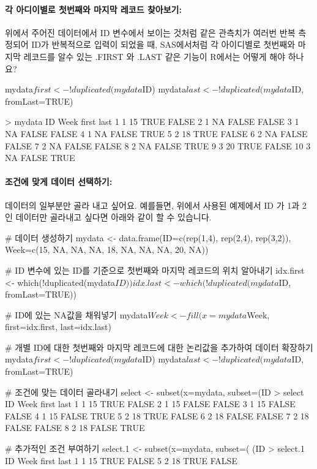 \documentclass{report}
\begin{document}
\paragraph{각 아디이별로 첫번째와 마지막 레코드 찾아보기: } 위에서 주어진 데이터에서 ID 변수에서 보이는 것처럼 같은 관측치가 여러번 반복 측정되어 ID가 반복적으로 입력이 되었을 때, SAS에서처럼 각 아이디별로 첫번째와 마지막 레코드를 알수 있는 .FIRST 와 .LAST 같은 기능이 R에서는 어떻게 해야 하나요?

\begin{Schunk}
\begin{Soutput}
mydata$first <- !duplicated(mydata$ID)
mydata$last <- !duplicated(mydata$ID, fromLast=TRUE)		

> mydata
   ID Week first  last
1   1   15  TRUE FALSE
2   1   NA FALSE FALSE
3   1   NA FALSE FALSE
4   1   NA FALSE  TRUE
5   2   18  TRUE FALSE
6   2   NA FALSE FALSE
7   2   NA FALSE FALSE
8   2   NA FALSE  TRUE
9   3   20  TRUE FALSE
10  3   NA FALSE  TRUE
	\end{Soutput}	
\end{Schunk}

\paragraph{조건에 맞게 데이터 선택하기:} 데이터의 일부분만 골라 내고 싶어요.  예를들면, 위에서 사용된 예제에서 ID 가 1과 2인 데이터만 골라내고 싶다면 아래와 같이 할 수 있습니다. 

\begin{Schunk}
\begin{Soutput}
# 데이터 생성하기
mydata <- data.frame(ID=c(rep(1,4), rep(2,4), rep(3,2)), Week=c(15, NA, NA, NA, 18, NA, NA, NA, 20, NA))

# ID 변수에 있는 ID를 기준으로 첫번째와 마지막 레코드의 위치 알아내기 
idx.first <- which(!duplicated(mydata$ID))
idx.last <- which(!duplicated(mydata$ID, fromLast=TRUE))

# ID에 있는 NA값을 채워넣기 
mydata$Week <- fill(x=mydata$Week, first=idx.first, last=idx.last)

# 개별 ID에 대한 첫번째와 마지막 레코드에 대한 논리값을 추가하여 데이터 확장하기 
mydata$first <- !duplicated(mydata$ID)
mydata$last <- !duplicated(mydata$ID, fromLast=TRUE)

# 조건에 맞는 데이터 골라내기 
select <- subset(x=mydata, subset=(ID %
> select
  ID Week first  last
1  1   15  TRUE FALSE
2  1   15 FALSE FALSE
3  1   15 FALSE FALSE
4  1   15 FALSE  TRUE
5  2   18  TRUE FALSE
6  2   18 FALSE FALSE
7  2   18 FALSE FALSE
8  2   18 FALSE  TRUE

# 추가적인 조건 부여하기
select.1 <- subset(x=mydata, subset=( (ID %
> select.1
  ID Week first  last
1  1   15  TRUE FALSE
5  2   18  TRUE FALSE
\end{Soutput}
\end{Schunk}
\end{document}
